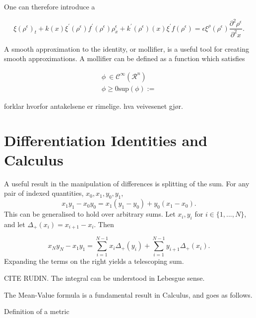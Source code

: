 \begin{definition}
 One can therefore introduce a 



\begin{equation}
	\xi(\rho^{\epsilon})_t + k(x) \xi^{'}(\rho^{\epsilon}) f^{'}(\rho^{\epsilon})\rho^{\epsilon}_x + k^{'}(\rho^{\epsilon})(x)\xi^{'}f(\rho^{\epsilon}) = \epsilon \xi^{\rho}(\rho^{\epsilon}) \frac{\partial^2 \rho^\epsilon}{\partial^2x}. 
\end{equation}


A smooth approximation to the identity, or mollifier, is a useful tool for creating smooth approximations. A mollifier can be defined as a function which satisfies

\begin{align}
\phi \ \in \mathscr{C}^{\infty}(\mathscr{R}^n) \\
\phi \geq 0 
\text{sup}(\phi) := 
\end{align}

forklar hvorfor antakelsene er rimelige. hva veivesenet gjør.
\fi



\iffalse
\section{Differentiation Identities and Calculus}
A useful result in the manipulation of differences is splitting of the sum. For any pair of indexed quantities, $x_0, x_1,y_0, y_1$, 
\begin{equation} \label{disc_diff_part}
    x_1y_1 - x_0 y_0 = x_1 \left(y_1 - y_0\right) + y_0 \left(x_1 - x_0\right).
\end{equation}
This can be generalised to hold over arbitrary sums. Let $x_i, y_i$ for $i \in \{1,...,N\}$, and let $\Delta_+(x_i) = x_{i+1} - x_i$. Then 

\begin{equation} \label{discreteDiffPart}
    x_{N}y_{N} - x_{1}y_{1} = \sum_{i = 1}^{N-1} x_i \Delta_+(y_i) + \sum_{i = 1}^{N-1} y_{i+1}\Delta_+(x_i).
\end{equation}
Expanding the terms on the right yields a telescoping sum. 

 CITE RUDIN.  The integral can be understood in Lebesgue sense. 

The Mean-Value formula is a fundamental result in Calculus, and goes as follows. 

\begin{}


Definition of a metric


\end{}
\end{definition}
